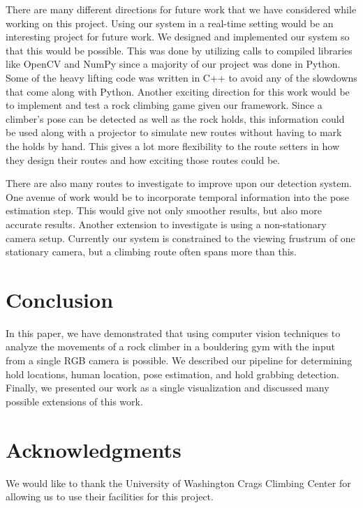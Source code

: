 \documentclass{chi2009}
\begin{document}
There are many different directions for future work that we have considered while working on this project. Using our system in a real-time setting would be an interesting project for future work. We designed and implemented our system so that this would be possible. This was done by utilizing calls to compiled libraries like OpenCV and NumPy since a majority of our project was done in Python. Some of the heavy lifting code was written in C++ to avoid any of the slowdowns that come along with Python. Another exciting direction for this work would be to implement and test a rock climbing game given our framework. Since a climber's pose can be detected as well as the rock holds, this information could be used along with a projector to simulate new routes without having to mark the holds by hand. This gives a lot more flexibility to the route setters in how they design their routes and how exciting those routes could be.

There are also many routes to investigate to improve upon our detection system. One avenue of work would be to incorporate temporal information into the pose estimation step. This would give not only smoother results, but also more accurate results. Another extension to investigate is using a non-stationary camera setup. Currently our system is constrained to the viewing frustrum of one stationary camera, but a climbing route often spans more than this.

\section{Conclusion}
In this paper, we have demonstrated that using computer vision techniques to analyze the movements of a rock climber in a bouldering gym with the input from a single RGB camera is possible. We described our pipeline for determining hold locations, human location, pose estimation, and hold grabbing detection. Finally, we presented our work as a single visualization and discussed many possible extensions of this work.

\section{Acknowledgments}

We would like to thank the University of Washington Crags Climbing Center for allowing us to use their facilities for this project.



\end{document}
